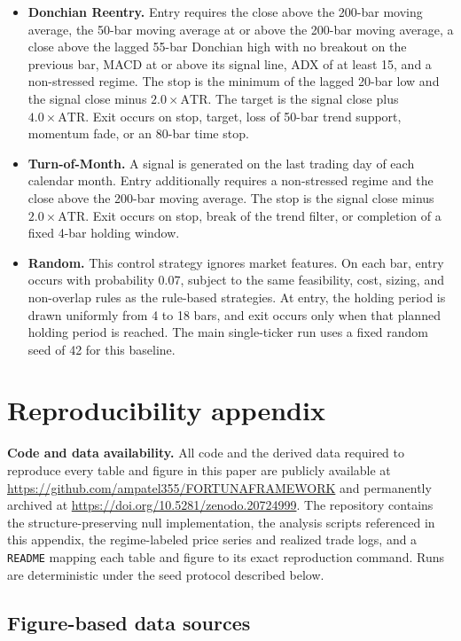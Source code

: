 \documentclass[preprint,12pt]{elsarticle}
\theoremstyle{definition}
\begin{document}
\begin{itemize}
\item \textbf{Donchian Reentry.} Entry requires the close above the 200-bar moving average, the 50-bar moving average at or above the 200-bar moving average, a close above the lagged 55-bar Donchian high with no breakout on the previous bar, MACD at or above its signal line, ADX of at least 15, and a non-stressed regime. The stop is the minimum of the lagged 20-bar low and the signal close minus \(2.0\times \mathrm{ATR}\). The target is the signal close plus \(4.0\times \mathrm{ATR}\). Exit occurs on stop, target, loss of 50-bar trend support, momentum fade, or an 80-bar time stop.

\item \textbf{Turn-of-Month.} A signal is generated on the last trading day of each calendar month. Entry additionally requires a non-stressed regime and the close above the 200-bar moving average. The stop is the signal close minus \(2.0\times \mathrm{ATR}\). Exit occurs on stop, break of the trend filter, or completion of a fixed 4-bar holding window.

\item \textbf{Random.} This control strategy ignores market features. On each bar, entry occurs with probability 0.07, subject to the same feasibility, cost, sizing, and non-overlap rules as the rule-based strategies. At entry, the holding period is drawn uniformly from 4 to 18 bars, and exit occurs only when that planned holding period is reached. The main single-ticker run uses a fixed random seed of 42 for this baseline.
\end{itemize}

\section{Reproducibility appendix}

\textbf{Code and data availability.} All code and the derived data required to reproduce every table and figure in this paper are publicly available at \url{https://github.com/ampatel355/FORTUNAFRAMEWORK} and permanently archived at \url{https://doi.org/10.5281/zenodo.20724999}. The repository contains the structure-preserving null implementation, the analysis scripts referenced in this appendix, the regime-labeled price series and realized trade logs, and a \texttt{README} mapping each table and figure to its exact reproduction command. Runs are deterministic under the seed protocol described below.

\subsection{Figure-based data sources}
\end{document}
